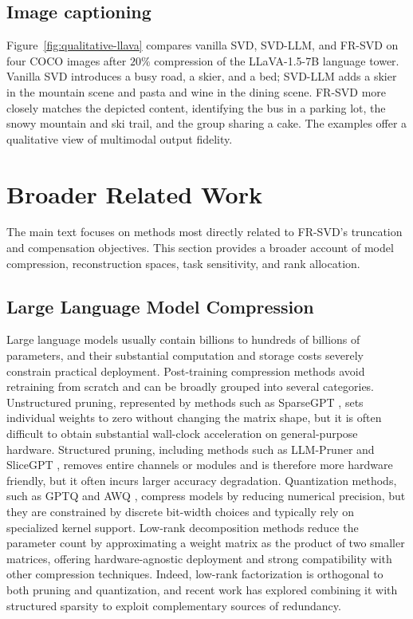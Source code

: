 

\subsection{Image captioning}
Figure~\ref{fig:qualitative-llava} compares vanilla SVD, SVD-LLM, and FR-SVD on four COCO images after $20\%$ compression of the LLaVA-1.5-7B language tower. Vanilla SVD introduces a busy road, a skier, and a bed; SVD-LLM adds a skier in the mountain scene and pasta and wine in the dining scene. FR-SVD more closely matches the depicted content, identifying the bus in a parking lot, the snowy mountain and ski trail, and the group sharing a cake. The examples offer a qualitative view of multimodal output fidelity.



\section{Broader Related Work}\label{app:related-work}
The main text focuses on methods most directly related to FR-SVD's truncation and compensation objectives. This section provides a broader account of model compression, reconstruction spaces, task sensitivity, and rank allocation.

\subsection{Large Language Model Compression}

Large language models usually contain billions to hundreds of billions of parameters, and their substantial computation and storage costs severely constrain practical deployment. Post-training compression methods avoid retraining from scratch and can be broadly grouped into several categories. Unstructured pruning, represented by methods such as SparseGPT \citep{frantar2023sparsegpt}, sets individual weights to zero without changing the matrix shape, but it is often difficult to obtain substantial wall-clock acceleration on general-purpose hardware. Structured pruning, including methods such as LLM-Pruner \citep{ma2023llmpruner} and SliceGPT \citep{ashkboos2024slicegpt}, removes entire channels or modules and is therefore more hardware friendly, but it often incurs larger accuracy degradation. Quantization methods, such as GPTQ \citep{frantar2023gptq} and AWQ \citep{lin2023awq}, compress models by reducing numerical precision, but they are constrained by discrete bit-width choices and typically rely on specialized kernel support. Low-rank decomposition methods \citep{hu2022lora,kaushal2023lord,sharma2023laser} reduce the parameter count by approximating a weight matrix as the product of two smaller matrices, offering hardware-agnostic deployment and strong compatibility with other compression techniques. Indeed, low-rank factorization is orthogonal to both pruning and quantization, and recent work has explored combining it with structured sparsity \citep{zong2025sslc,tao2025lsprism} to exploit complementary sources of redundancy.


